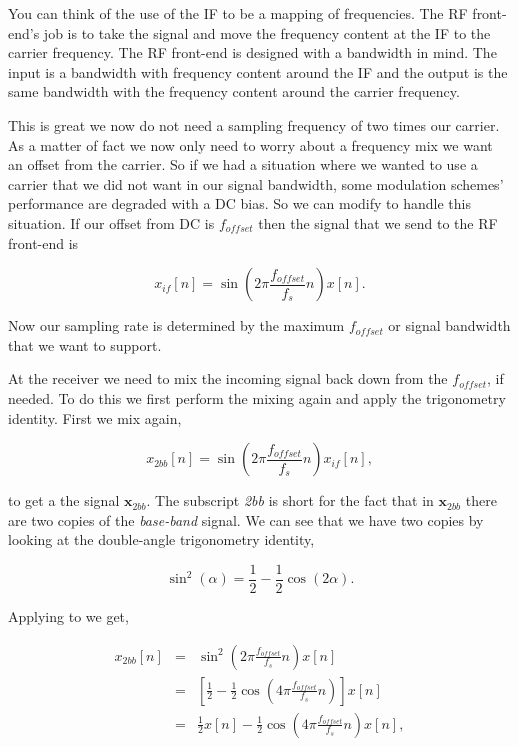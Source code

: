 You can think of the use of the \ac{IF} to be a mapping of frequencies. The \ac{RF} front-end's job is to take the signal and move the frequency content at the \ac{IF} to the carrier frequency. The \ac{RF} front-end is designed with a bandwidth in mind. The input is a bandwidth with frequency content around the \ac{IF} and the output is the same bandwidth with the frequency content around the carrier frequency.

This is great we now do not need a sampling frequency of two times our carrier. As a matter of fact we now only need to worry about a frequency mix we want an offset from the carrier. So if we had a situation where we wanted to use a carrier that we did not want in our signal bandwidth, some modulation schemes' performance are degraded with a \ac{DC} bias. So we can modify  to handle this situation. If our offset from \ac{DC} is $f_{offset}$ then the signal that we send to the \ac{RF} front-end is

\begin{equation}
\label{eq:ifmix}
x_{if}[n] = \sin\left(2\pi\frac{f_{offset}}{f_s}n\right)x[n].
\end{equation}	

Now our sampling rate is determined by the maximum $f_{offset}$ or signal bandwidth that we want to support.

At the receiver we need to mix the incoming signal back down from the $f_{offset}$, if needed. To do this we first perform the mixing again and apply the trigonometry identity. First we mix again,

\begin{equation}
\label{eq:2xbb}
x_{2bb}[n] = \sin\left(2\pi\frac{f_{offset}}{f_s}n\right)x_{if}[n],
\end{equation}

to get a the signal $\mathbf{x}_{2bb}$. The subscript \emph{2bb} is short for the fact that in $\mathbf{x}_{2bb}$ there are two copies of the \emph{base-band} signal. We can see that we have two copies by looking at the double-angle trigonometry identity,

\begin{equation}
\label{eq:trigid}
\sin^2(\alpha) = \frac{1}{2} - \frac{1}{2}\cos(2\alpha).
\end{equation}

Applying  to  we get,

\begin{eqnarray}
\label{eq:2bbtrig}
x_{2bb}[n] &=& \sin^2\left(2\pi\frac{f_{offset}}{f_s}n\right)x[n]\\
&=& \left[\frac{1}{2} - \frac{1}{2}\cos(4\pi\frac{f_{offset}}{f_s}n)\right]x[n]\\
&=& \frac{1}{2}x[n] - \frac{1}{2}\cos\left(4\pi\frac{f_{offset}}{f_s}n\right)x[n],
\end{eqnarray}

